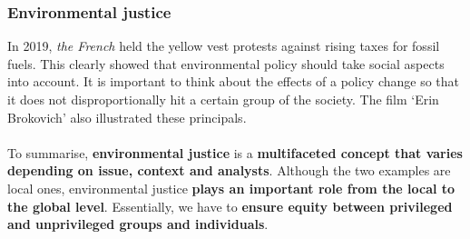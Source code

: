 \documentclass[../summary.tex]{subfiles}
\begin{document}
		\subsubsection{Environmental justice}
			In 2019, \emph{the French} held the yellow vest protests against rising taxes for fossil fuels. This clearly showed that environmental policy should take social aspects into account. It is important to think about the effects of a policy change so that it does not disproportionally hit a certain group of the society. The film `Erin Brokovich' also illustrated these principals.\\
			\\
			To summarise, \textbf{environmental justice} is a \textbf{multifaceted concept that varies depending on issue, context and analysts}. Although the two examples are local ones, environmental justice \textbf{plays an important role from the local to the global level}. Essentially, we have to \textbf{ensure equity between privileged and unprivileged groups and individuals}. 
		
		
\end{document}
